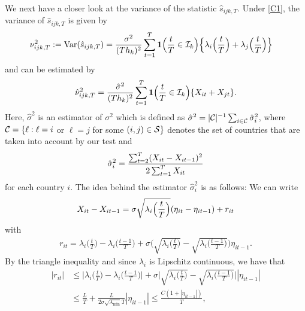 \documentclass[a4paper,12pt]{article}
\numberwithin{equation}{section}
\begin{document}
{We next have a closer look at the variance of the statistic $\hat{s}_{ijk,T}$. Under \ref{C1}, the variance of $\hat{s}_{ijk,T}$ is given by
\begin{align*}
\nu_{ijk,T}^2 := \textnormal{Var}(\hat{s}_{ijk,T}) 
 & = \frac{\sigma^2}{(Th_k)^2} \sum\limits_{t=1}^T \boldsymbol{1}\Big(\frac{t}{T} \in \mathcal{I}_k\Big) \Big\{ \lambda_i\Big(\frac{t}{T}\Big) + \lambda_j\Big(\frac{t}{T}\Big) \Big\} 
\end{align*}
and can be estimated by 
\[ \hat{\nu}_{ijk,T}^2 = \frac{\hat{\sigma}^2}{(Th_k)^2} \sum\limits_{t=1}^T \boldsymbol{1}\Big(\frac{t}{T} \in \mathcal{I}_k\Big) \{ X_{it} + X_{jt} \}. \]
Here, $\hat{\sigma}^2$ is an estimator of $\sigma^2$ which is defined as $\hat{\sigma}^2 = |\mathcal{C}|^{-1} \sum_{i \in \mathcal{C}} \hat{\sigma}_i^2$, where $\mathcal{C} = \{ \ell: \ell = i$ or $\ell = j$ for some $(i,j) \in \mathcal{S} \}$ denotes the set of countries that are taken into account by our test and 
\begin{align*}
\hat{\sigma}_i^2 = \frac{\sum_{t=2}^T (X_{it}-X_{it-1})^2}{2 \sum_{t=1}^T X_{it}}
\end{align*}
for each country $i$. 
The idea behind the estimator $\hat{\sigma}_i^2$ is as follows: We can write 
\begin{equation}\label{eq:idea-sigmahat-1}
X_{it} - X_{it-1} = \sigma \sqrt{\lambda_i\Big(\frac{t}{T}\Big)} (\eta_{it} - \eta_{it-1}) + r_{it} 
\end{equation}
with
\begin{align*}
r_{it} = \lambda_i\Big(\frac{t}{T}\Big) - \lambda_i\Big(\frac{t-1}{T}\Big) + \sigma \bigg( \sqrt{\lambda_i\Big(\frac{t}{T}\Big)} - \sqrt{\lambda_i\Big(\frac{t-1}{T}\Big)} \bigg)\eta_{it-1}.
\end{align*}
By the triangle inequality and since $\lambda_i$ is Lipschitz continuous, we have that
\begin{align}
|r_{it}| & \le \bigg| \lambda_i\Big(\frac{t}{T}\Big) - \lambda_i\Big(\frac{t-1}{T}\Big)\bigg| +  \sigma \bigg| \sqrt{\lambda_i\Big(\frac{t}{T}\Big)} - \sqrt{\lambda_i\Big(\frac{t-1}{T}\Big)} \bigg| |\eta_{it-1}| \nonumber \\
& \le \frac{L}{T}  + \frac{L}{2 \sigma \sqrt{\lambda_{\min}} T} |\eta_{it-1}| \le \frac{C (1 + |\eta_{it-1}|)}{T}, \label{eq:idea-sigmahat-2}
\end{align}
}
\end{document}
